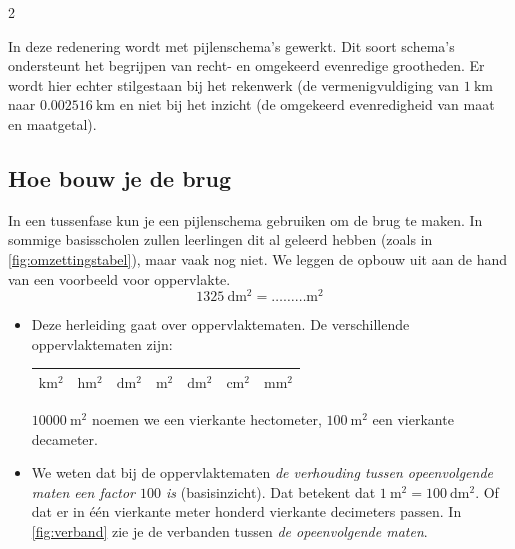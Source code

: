 
\begin{multicols}{2}

In deze redenering wordt met pijlenschema's gewerkt.
Dit soort schema's ondersteunt het begrijpen van recht- en omgekeerd evenredige grootheden.
Er wordt hier echter stilgestaan bij het rekenwerk (de vermenigvuldiging van \(\SI{1}{\kilo\metre}\) naar \(\SI{0.002516}{\kilo\metre}\) en niet bij het inzicht (de omgekeerd evenredigheid van maat en maatgetal).

\subsection{Hoe bouw je de brug}

In een tussenfase kun je een pijlenschema gebruiken om de brug te maken.
In sommige basisscholen zullen leerlingen dit al geleerd hebben (zoals in \autoref{fig:omzettingstabel}), maar vaak nog niet.
We leggen de opbouw uit aan de hand van een voorbeeld voor oppervlakte.
\[
\SI{1325}{\deci\metre\squared} = \ldots\ldots\ldots\si{\metre\squared}
\]

\begin{itemize}
\item Deze herleiding gaat over oppervlaktematen.
De verschillende oppervlaktematen zijn:
\begin{tabel}
    \begin{tabular}{|m{0.7cm}|m{0.7cm}|m{0.7cm}|m{0.7cm}|m{0.7cm}|m{0.7cm}|m{0.7cm}|}
		\hline
        \(\si{\kilo\metre\squared}\) & \(\si{\hecto\metre\squared}\) & \(\si{\deca\metre\squared}\) & \;\(\si{\metre\squared}\) & \(\si{\deci\metre\squared}\) & \(\si{\centi\metre\squared}\) & \(\si{\milli\metre\squared}\)\\
        \hline
	\end{tabular}
\end{tabel}
\(\SI{10000}{\metre\squared}\) noemen we een vierkante hectometer, \(\SI{100}{\metre\squared}\) een vierkante decameter.

\item We weten dat bij de oppervlaktematen \emph{de verhouding tussen opeenvolgende maten een factor \(100\) is} (basisinzicht).
Dat betekent dat \(\SI{1}{\metre\squared} = \SI{100}{\deci\metre\squared}\).
Of dat er in één vierkante meter honderd vierkante decimeters passen.
In \autoref{fig:verband} zie je de verbanden tussen \emph{de opeenvolgende maten}.


\end{itemize}
\end{multicols}
